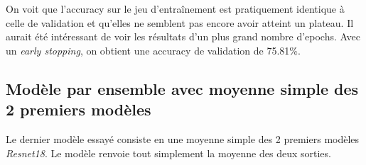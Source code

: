 On voit que l'accuracy sur le jeu d'entraînement est pratiquement identique à celle de validation et qu'elles ne semblent pas encore avoir atteint un plateau. Il aurait été intéressant de voir les résultats d'un plus grand nombre d'epochs. Avec un \emph{early stopping}, on obtient une accuracy de validation de 75.81\%. 


\subsection{Modèle par ensemble avec moyenne simple des 2 premiers modèles}

Le dernier modèle essayé consiste en une moyenne simple des 2 premiers modèles \emph{Resnet18}. Le modèle renvoie tout simplement la moyenne des deux sorties.
